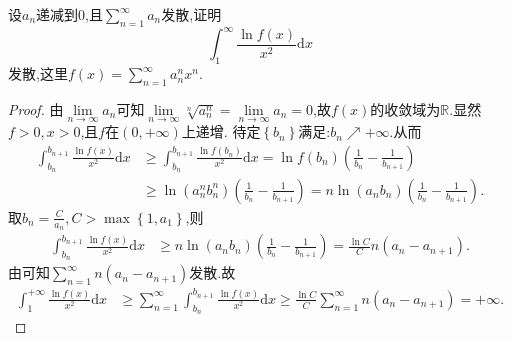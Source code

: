 \documentclass[../../main.tex]{subfiles}%
\begin{document}
\begin{example}
设$a_n$递减到$0$,且$\sum\limits_{n=1}^\infty a_n$发散,证明
$$\int_1^\infty \frac{\ln f(x)}{x^2}\mathrm{d}x$$
发散,这里$f(x)=\sum\limits_{n=1}^\infty a_n^n x^n$.
\end{example}
\begin{proof}
由$\lim\limits_{n\rightarrow \infty}a_n$可知$\lim\limits_{n\rightarrow \infty}\sqrt[n]{a_{n}^{n}}=\lim\limits_{n\rightarrow \infty}a_n=0$,故$f\left( x \right)$的收敛域为$\mathbb{R}$.显然$f>0,x>0$,且$f$在$\left( 0,+\infty \right)$上递增.
待定$\left\{ b_n \right\}$满足:$b_n\nearrow +\infty$.从而
\begin{align*}
\int_{b_n}^{b_{n+1}}{\frac{\ln f\left( x \right)}{x^2}\mathrm{d}x}&\geqslant \int_{b_n}^{b_{n+1}}{\frac{\ln f\left( b_n \right)}{x^2}\mathrm{d}x}=\ln f\left( b_n \right) \left( \frac{1}{b_n}-\frac{1}{b_{n+1}} \right) \\
&\geqslant \ln \left( a_{n}^{n}b_{n}^{n} \right) \left( \frac{1}{b_n}-\frac{1}{b_{n+1}} \right) =n\ln \left( a_nb_n \right) \left( \frac{1}{b_n}-\frac{1}{b_{n+1}} \right) .
\end{align*}
取$b_n=\frac{C}{a_n},C>\max \left\{ 1,a_1 \right\}$,则
\begin{align*}
\int_{b_n}^{b_{n+1}}{\frac{\ln f\left( x \right)}{x^2}\mathrm{d}x}&\geqslant n\ln \left( a_nb_n \right) \left( \frac{1}{b_n}-\frac{1}{b_{n+1}} \right) =\frac{\ln C}{C}n\left( a_n-a_{n+1} \right) .
\end{align*}
由可知$\sum_{n=1}^{\infty}{n\left( a_n-a_{n+1} \right)}$发散.故
\begin{align*}
\int_1^{+\infty}{\frac{\ln f\left( x \right)}{x^2}\mathrm{d}x}&\geqslant \sum_{n=1}^{\infty}{\int_{b_n}^{b_{n+1}}{\frac{\ln f\left( x \right)}{x^2}\mathrm{d}x}}\geqslant \frac{\ln C}{C}\sum_{n=1}^{\infty}{n\left( a_n-a_{n+1} \right)}=+\infty .
\end{align*}
\end{proof}
\end{document}
